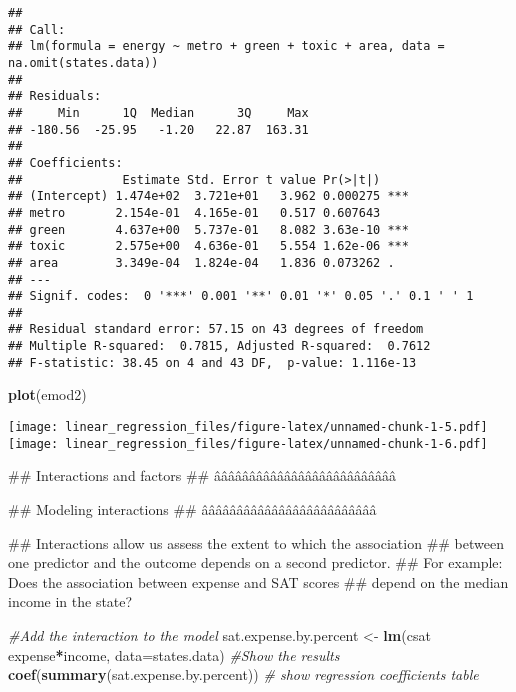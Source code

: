 \documentclass[]{article}
\newenvironment{Shaded}{\begin{snugshade}}{\end{snugshade}}
\newcommand{\KeywordTok}[1]{\textcolor[rgb]{0.13,0.29,0.53}{\textbf{#1}}}
\newcommand{\DataTypeTok}[1]{\textcolor[rgb]{0.13,0.29,0.53}{#1}}
\newcommand{\StringTok}[1]{\textcolor[rgb]{0.31,0.60,0.02}{#1}}
\newcommand{\CommentTok}[1]{\textcolor[rgb]{0.56,0.35,0.01}{\textit{#1}}}
\newcommand{\OperatorTok}[1]{\textcolor[rgb]{0.81,0.36,0.00}{\textbf{#1}}}
\newcommand{\NormalTok}[1]{#1}
\begin{document}
\begin{verbatim}
## 
## Call:
## lm(formula = energy ~ metro + green + toxic + area, data = na.omit(states.data))
## 
## Residuals:
##     Min      1Q  Median      3Q     Max 
## -180.56  -25.95   -1.20   22.87  163.31 
## 
## Coefficients:
##              Estimate Std. Error t value Pr(>|t|)    
## (Intercept) 1.474e+02  3.721e+01   3.962 0.000275 ***
## metro       2.154e-01  4.165e-01   0.517 0.607643    
## green       4.637e+00  5.737e-01   8.082 3.63e-10 ***
## toxic       2.575e+00  4.636e-01   5.554 1.62e-06 ***
## area        3.349e-04  1.824e-04   1.836 0.073262 .  
## ---
## Signif. codes:  0 '***' 0.001 '**' 0.01 '*' 0.05 '.' 0.1 ' ' 1
## 
## Residual standard error: 57.15 on 43 degrees of freedom
## Multiple R-squared:  0.7815, Adjusted R-squared:  0.7612 
## F-statistic: 38.45 on 4 and 43 DF,  p-value: 1.116e-13
\end{verbatim}

\begin{Shaded}
\begin{Highlighting}[]
\KeywordTok{plot}\NormalTok{(emod2)}
\end{Highlighting}
\end{Shaded}

\texttt{[image: linear\_regression\_files/figure-latex/unnamed-chunk-1-5.pdf]}
\texttt{[image: linear\_regression\_files/figure-latex/unnamed-chunk-1-6.pdf]}

\begin{Shaded}
\begin{Highlighting}[]
\NormalTok{## Interactions and factors}
\NormalTok{## ââââââââââââââââââââââââââ}

\NormalTok{## Modeling interactions}
\NormalTok{## âââââââââââââââââââââââââ}

\NormalTok{##   Interactions allow us assess the extent to which the association}
\NormalTok{##   between one predictor and the outcome depends on a second predictor.}
\NormalTok{##   For example: Does the association between expense and SAT scores}
\NormalTok{##   depend on the median income in the state?}

  \CommentTok{#Add the interaction to the model}
\NormalTok{sat.expense.by.percent <-}\StringTok{ }\KeywordTok{lm}\NormalTok{(csat }\OperatorTok{~}\StringTok{ }\NormalTok{expense}\OperatorTok{*}\NormalTok{income,}
                             \DataTypeTok{data=}\NormalTok{states.data) }
\CommentTok{#Show the results}
  \KeywordTok{coef}\NormalTok{(}\KeywordTok{summary}\NormalTok{(sat.expense.by.percent)) }\CommentTok{# show regression coefficients table}
\end{Highlighting}
\end{Shaded}
\end{document}

